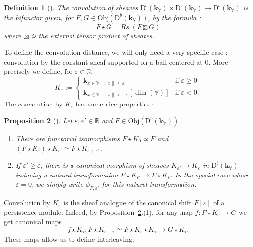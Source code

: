 \documentclass[a4paper, english, 11pt]{article}
\newcommand{\kk}[0]{\textbf{k}}
\newcommand{\0}{\vec{0}}
\newcommand{\R}[0]{\mathbb{R}}
\newcommand{\V}[0]{\mathbb{V}}
\newcommand{\D}[0]{\text{D}}
\newcommand{\Obj}[0]{\text{Obj}}
\newtheorem{prop}{Proposition}[section]
\newtheorem{defi}[prop]{Definition}
\begin{document}
\begin{defi}[\cite{KS18}]\label{D:Convolution} The convolution of sheaves  $\D^b(\kk_\V)\times \D^b(\kk_\V) \to \D^b(\kk_\V)$ is the bifunctor given, 
for $F,G\in \Obj(\D^b(\kk_\V))$,  by the formula : $$F\star G = R s_!(F\boxtimes G)$$ where $\boxtimes$ is the external tensor product of sheaves. 
\end{defi}
To define the convolution distance,  we will only need a very specific case :  convolution by the constant sheaf supported on a ball centered at 0. 
More precisely we define, for $\varepsilon \in \R$, 
\begin{equation}\label{eq:defKepsilon}
 K_\varepsilon :=  \left\{ \begin{array}{cc} 
 \kk_{x\in \V, \mid \|x\|\leq \varepsilon}  & \mbox{if } \varepsilon \geq 0 \\
 \kk_{x\in \V, \mid \|x\|< -\varepsilon}[\dim(\V)]  & \mbox{if } \varepsilon < 0 .\end{array} \right.
\end{equation}
The convolution by $K_\varepsilon$ has some nice properties : 
\begin{prop}[\cite{KS18}]\label{P:propertiesofconvolution} Let $\varepsilon, \varepsilon'\in \R$ and $F \in \Obj(\D^b(\kk_\V))$. 
\begin{enumerate}
\item There are functorial isomorphisms $F\star K_0\simeq F$ and $(F\star K_{\varepsilon} )\star K_{\varepsilon'} \simeq F \star K_{\varepsilon + \varepsilon'} $.
\item If $\varepsilon' \geq \varepsilon $, there is a canonical morphism of sheaves 
$K_{\varepsilon'}\to K_{\varepsilon}$ in $\D^b(\kk_\V)$
inducing a natural transformation $F\star K_{\varepsilon'} \to F \star K_{\varepsilon} $. 
In the special case where $\varepsilon = 0$, we simply write $\phi_{F, \varepsilon'}$ for this natural transformation.
\end{enumerate}
\end{prop}
Convolution by $K_{\varepsilon}$ is the sheaf analogue of the canonical shift $F[\varepsilon]$ of a persistence module. Indeed, by
Proposition~\ref{P:propertiesofconvolution}.(1),  for any map $f: F\star K_{\varepsilon} \to G$ we get  canonical maps  
\begin{equation} \label{eq:propertiesofconvolution} f\star K_{\tau}: F\star K_{\varepsilon+\tau}\simeq F\star  K_{\varepsilon}\star K_{\tau}  \to G \star K_{\tau}.\end{equation} 
These  maps allow us to define interleaving.
\end{document}
